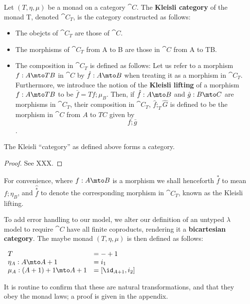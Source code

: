\begin{definition}
  Let $(T,\eta,\mu)$ be a monad on a category $\cat{C}$. The \textbf{Kleisli category}
  of the monad T, denoted $\cat{C}_T$, is the category constructed as follows:
  \begin{itemize}
    \item The obejcts of $\cat{C}_T$ are those of $\cat{C}$.
    \item The morphisms of $\cat{C}_T$ from A to B are those in $\cat{C}$ from A to TB.
    \item The composition in $\cat{C}_T$ is defined as follows: Let us refer to a
      morphism $f: A \mto TB$ in $\cat{C}$ by $\hat{f} : A \mto B$ when treating it as
      a morphism in $\cat{C}_T$. Furthermore, we introduce the notion of the \textbf{Kleisli
      lifting} of a morphism $f: A \mto TB$ to be $\bar{f} = Tf ; \mu_B$.
      Then, if $\hat{f} : A \mto B$ and $\hat{g} : B \mto C$
      are morphisms in $\cat{C}_T$, their composition in $\cat{C}_T$, $\hat{f} ;_T \hat{G}$
      is defined to be the morphism in $\cat{C}$ from $A$ to $TC$ given by
      \[
      f; \bar{g}
      \].
  \end{itemize}
\end{definition}

\begin{theorem}
  The Kleisli ``category'' as defined above forms a category.
\end{theorem}
\begin{proof}
  See XXX.
\end{proof}

For convenience, where $f: A \mto B$ is a morphism
we shall henceforth $\overset{*}{f}$ to mean $f;\eta_B$, and
$\hat{\overset{*}{f}}$ to denote the corresponding morphism
in $\cat{C}_T$, known as the Kleisli lifting.

To add error handling to our model, we alter our definition of an
untyped $\lambda$ model to require $\cat{C}$ have all
finite coproducts, rendering it a \textbf{bicartesian category}. The
maybe monad $(T, \eta, \mu)$ is then defined as follows:
\begin{center}
  \begin{math}
    \begin{array}{ll}
      T & = - + 1 \\
      \eta_A : A \mto A + 1 & = i_1 \\
      \mu_A : (A + 1) + 1 \mto A + 1 & = [ \id_{A+1}, i_2] \\
    \end{array}
  \end{math}
\end{center}
It is routine to confirm that these are natural transformations,
and that they obey the monad laws; a proof is given in the appendix.

